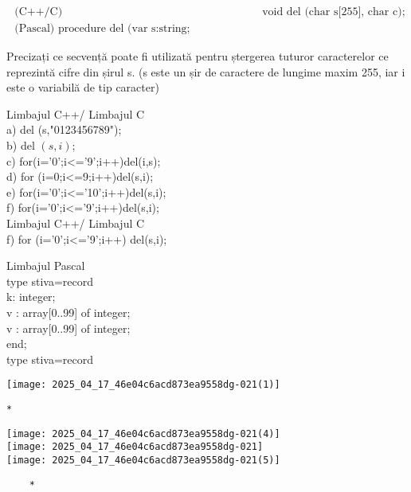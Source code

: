 $$
\begin{array}{ll}
\text { (C++/C) } & \text { void del (char s[255], char c); } \\
\text { (Pascal) procedure del (var s:string; c:character); }
\end{array}
$$

Precizați ce secvență poate fi utilizată pentru ștergerea tuturor caracterelor ce reprezintă cifre din șirul s. (s este un șir de caractere de lungime maxim 255, iar i este o variabilă de tip caracter)

Limbajul C++/ Limbajul C\\
a) del (s,"0123456789");\\
b) del $(s, i)$;\\
c) for(i='0';i<='9';i++)del(i,s);\\
d) for (i=0;i<=9;i++)del(s,i);\\
e) for(i='0';i<='10';i++)del(s,i);\\
f) for(i='0';i<='9';i++)del(s,i);\\
Limbajul C++/ Limbajul C\\
f) for (i='0';i<='9';i++) del(s,i);

Limbajul Pascal\\
type stiva=record\\
k: integer;\\[0pt]
v : array[0..99] of integer;\\[0pt]
v : array[0..99] of integer;\\
end;\\
type stiva=record

\texttt{[image: 2025\_04\_17\_46e04c6acd873ea9558dg-021(1)]}\\
$\qquad$\\
$\qquad$\\
$\qquad$

\begin{verbatim}
*
\end{verbatim}

\texttt{[image: 2025\_04\_17\_46e04c6acd873ea9558dg-021(4)]}\\
\texttt{[image: 2025\_04\_17\_46e04c6acd873ea9558dg-021]}\\
\texttt{[image: 2025\_04\_17\_46e04c6acd873ea9558dg-021(5)]}

\begin{verbatim}
    *
\end{verbatim}

